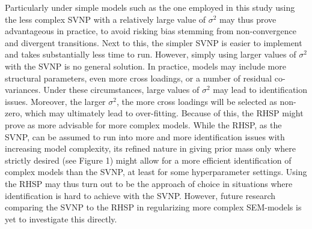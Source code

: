 \documentclass[
  man, donotrepeattitle,floatsintext]{apa6}
\begin{document}
Particularly under simple models such as the one employed in this study
using the less complex SVNP with a relatively large value of \(\sigma^2\)
may thus prove advantageous in practice, to avoid risking bias stemming
from non-convergence and divergent transitions. Next to this, the
simpler SVNP is easier to implement and takes substantially less time to
run. However, simply using larger values of \(\sigma^2\) with the SVNP is
no general solution. In practice, models may include more structural
parameters, even more cross loadings, or a number of residual
co-variances. Under these circumstances, large values of \(\sigma^2\) may
lead to identification issues. Moreover, the larger \(\sigma^2\), the more
cross loadings will be selected as non-zero, which may ultimately lead
to over-fitting. Because of this, the RHSP might prove as more advisable
for more complex models. While the RHSP, as the SVNP, can be assumed to
run into more and more identification issues with increasing model
complexity, its refined nature in giving prior mass only where strictly
desired (see Figure 1) might allow for a more efficient identification
of complex models than the SVNP, at least for some hyperparameter
settings. Using the RHSP may thus turn out to be the approach of choice
in situations where identification is hard to achieve with the SVNP.
However, future research comparing the SVNP to the RHSP in regularizing
more complex SEM-models is yet to investigate this directly.
\end{document}
